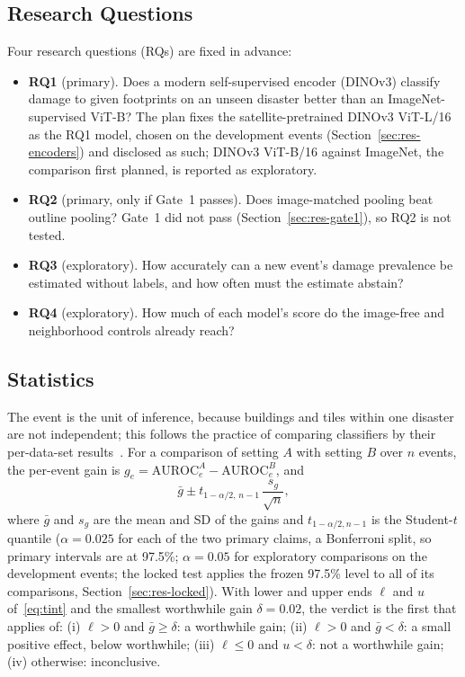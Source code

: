 \documentclass{ieeeaccess}
\begin{document}
\subsection{Research Questions}
Four research questions (RQs) are fixed in advance:
\begin{itemize}
\item \textbf{RQ1} (primary). Does a modern self-supervised encoder (DINOv3) classify damage to given footprints on an unseen disaster better than an ImageNet-supervised ViT-B? The plan fixes the satellite-pretrained DINOv3 ViT-L/16 as the RQ1 model, chosen on the development events (Section~\ref{sec:res-encoders}) and disclosed as such; DINOv3 ViT-B/16 against ImageNet, the comparison first planned, is reported as exploratory.
\item \textbf{RQ2} (primary, only if Gate~1 passes). Does image-matched pooling beat outline pooling? Gate~1 did not pass (Section~\ref{sec:res-gate1}), so RQ2 is not tested.
\item \textbf{RQ3} (exploratory). How accurately can a new event's damage prevalence be estimated without labels, and how often must the estimate abstain?
\item \textbf{RQ4} (exploratory). How much of each model's score do the image-free and neighborhood controls already reach?
\end{itemize}

\subsection{Statistics}
\label{sec:stats}
The event is the unit of inference, because buildings and tiles within one disaster are not independent; this follows the practice of comparing classifiers by their per-data-set results~\cite{demsar2006comparisons}. For a comparison of setting $A$ with setting $B$ over $n$ events, the per-event gain is $g_e=\mathrm{AUROC}_e^{A}-\mathrm{AUROC}_e^{B}$, and
\begin{equation}
\bar g\pm t_{1-\alpha/2,\,n-1}\,\frac{s_g}{\sqrt{n}},
\label{eq:tint}
\end{equation}
where $\bar g$ and $s_g$ are the mean and SD of the gains and $t_{1-\alpha/2,n-1}$ is the Student-$t$ quantile ($\alpha=0.025$ for each of the two primary claims, a Bonferroni split, so primary intervals are at 97.5\%; $\alpha=0.05$ for exploratory comparisons on the development events; the locked test applies the frozen 97.5\% level to all of its comparisons, Section~\ref{sec:res-locked}). With lower and upper ends $\ell$ and $u$ of~\eqref{eq:tint} and the smallest worthwhile gain $\delta=0.02$, the verdict is the first that applies of: (i) $\ell>0$ and $\bar g\ge\delta$: a worthwhile gain; (ii) $\ell>0$ and $\bar g<\delta$: a small positive effect, below worthwhile; (iii) $\ell\le0$ and $u<\delta$: not a worthwhile gain; (iv) otherwise: inconclusive.
\end{document}

